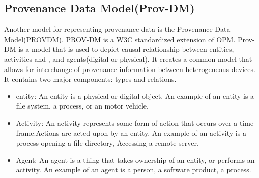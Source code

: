 

\subsection{Provenance Data Model(Prov-DM)}

Another model for representing provenance data is the Provenance Data Model(PROV\-DM). PROV-DM is a W3C standardized extension of OPM. Prov-DM is a model that is used to depict causal relationship between entities, activities and , and agents(digital or physical).  It creates a common model that allows for interchange of provenance information between heterogeneous devices. It contains two major components: types and relations. 


\begin{itemize}

\item entity: An entity is a physical or digital object. An example of an entity is a file system, a process, or an motor vehicle.

\item Activity: An activity represents some form of action that occurs over a time frame.Actions are acted upon by an entity. An example of an activity is a process opening a file directory, Accessing a remote server.

\item Agent: An agent is a thing that takes ownership of an entity, or performs an activity. An example of an agent is a person, a software product, a process.
\end{itemize}

